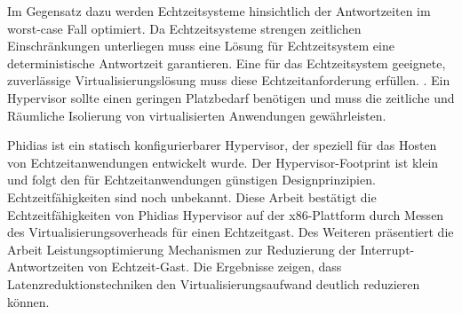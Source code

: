 Im Gegensatz dazu werden Echtzeitsysteme hinsichtlich der Antwortzeiten im worst-case Fall optimiert.
Da Echtzeitsysteme strengen zeitlichen Einschr{\"a}nkungen unterliegen muss eine L{\"o}sung f{\"u}r Echtzeitsystem eine deterministische Antwortzeit garantieren.
Eine f{\"u}r das Echtzeitsystem geeignete, zuverl{\"a}ssige Virtualisierungsl{\"o}sung muss diese Echtzeitanforderung erfüllen.
.
Ein Hypervisor sollte einen geringen Platzbedarf benötigen und muss die zeitliche und R{\"a}umliche Isolierung von virtualisierten Anwendungen gew{\"a}hrleisten.

Phidias ist ein statisch konfigurierbarer Hypervisor, der speziell f{\"u}r das Hosten von Echtzeitanwendungen entwickelt wurde.
Der Hypervisor-Footprint ist klein und folgt den f{\"u}r Echtzeitanwendungen g{\"u}nstigen Designprinzipien.
Echtzeitf{\"a}higkeiten sind noch unbekannt. Diese Arbeit best{\"a}tigt die Echtzeitf{\"a}higkeiten von Phidias Hypervisor auf der x86-Plattform
durch Messen des Virtualisierungsoverheads f{\"u}r einen Echtzeitgast. Des Weiteren pr{\"a}sentiert die Arbeit Leistungsoptimierung
Mechanismen zur Reduzierung der Interrupt-Antwortzeiten von Echtzeit-Gast.
Die Ergebnisse zeigen, dass Latenzreduktionstechniken den Virtualisierungsaufwand deutlich reduzieren k{\"o}nnen.
